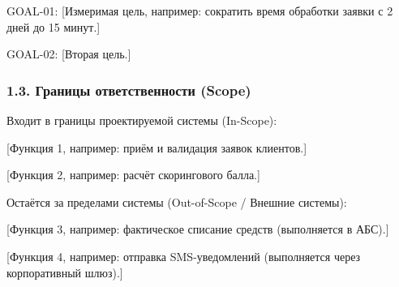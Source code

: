 \documentclass[10pt,a4paper]{article}
\begin{document}
GOAL-01: {[}Измеримая цель, например: сократить время обработки заявки с 2 дней до 15 минут.{]}

GOAL-02: {[}Вторая цель.{]}

\subsubsection{1.3. Границы ответственности (Scope)}\label{13-ux433ux440ux430ux43dux438ux446ux44b-ux43eux442ux432ux435ux442ux441ux442ux432ux435ux43dux43dux43eux441ux442ux438-scope}

Входит в границы проектируемой системы (In-Scope):

{[}Функция 1, например: приём и валидация заявок клиентов.{]}

{[}Функция 2, например: расчёт скорингового балла.{]}

Остаётся за пределами системы (Out-of-Scope / Внешние системы):

{[}Функция 3, например: фактическое списание средств (выполняется в АБС).{]}

{[}Функция 4, например: отправка SMS-уведомлений (выполняется через корпоративный шлюз).{]}

\end{document}
